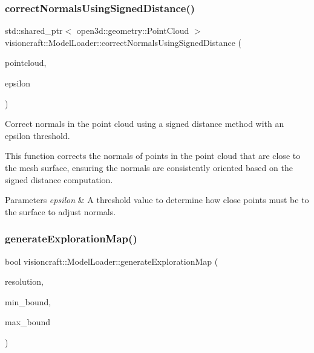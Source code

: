 \subsubsection{\texorpdfstring{correct\+Normals\+Using\+Signed\+Distance()}{correctNormalsUsingSignedDistance()}\hspace{0.1cm}{\footnotesize\ttfamily [2/2]}}
{\footnotesize\ttfamily std\+::shared\+\_\+ptr$<$ open3d\+::geometry\+::\+Point\+Cloud $>$ visioncraft\+::\+Model\+Loader\+::correct\+Normals\+Using\+Signed\+Distance (\begin{DoxyParamCaption}\item[{std\+::shared\+\_\+ptr$<$ open3d\+::geometry\+::\+Point\+Cloud $>$}]{pointcloud,  }\item[{double}]{epsilon }\end{DoxyParamCaption})}



Correct normals in the point cloud using a signed distance method with an epsilon threshold. 

This function corrects the normals of points in the point cloud that are close to the mesh surface, ensuring the normals are consistently oriented based on the signed distance computation.


\begin{DoxyParams}{Parameters}
{\em epsilon} & A threshold value to determine how close points must be to the surface to adjust normals. \\
\hline
\end{DoxyParams}
\mbox{\label{classvisioncraft_1_1ModelLoader_a836161273c92de2284e0be6807517b4e}} 
\subsubsection{\texorpdfstring{generate\+Exploration\+Map()}{generateExplorationMap()}\hspace{0.1cm}{\footnotesize\ttfamily [1/2]}}
{\footnotesize\ttfamily bool visioncraft\+::\+Model\+Loader\+::generate\+Exploration\+Map (\begin{DoxyParamCaption}\item[{double}]{resolution,  }\item[{const octomap\+::point3d \&}]{min\+\_\+bound,  }\item[{const octomap\+::point3d \&}]{max\+\_\+bound }\end{DoxyParamCaption})}



